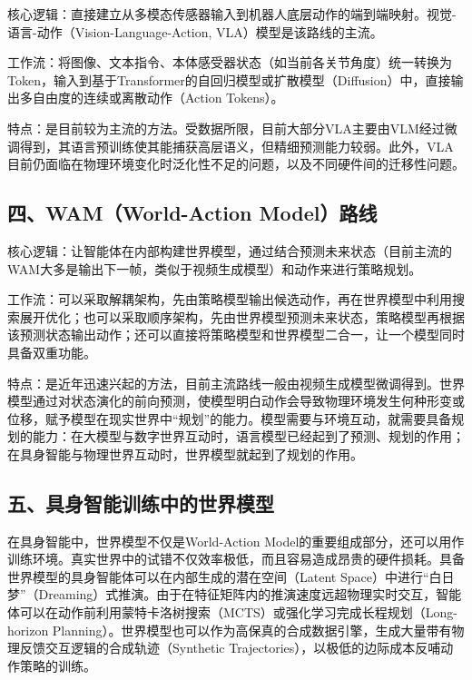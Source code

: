 核心逻辑：直接建立从多模态传感器输入到机器人底层动作的端到端映射。视觉-语言-动作（Vision-Language-Action, VLA）模型是该路线的主流。

工作流：将图像、文本指令、本体感受器状态（如当前各关节角度）统一转换为Token，输入到基于Transformer的自回归模型或扩散模型（Diffusion）中，直接输出多自由度的连续或离散动作（Action Tokens）。

特点：是目前较为主流的方法。受数据所限，目前大部分VLA主要由VLM经过微调得到，其语言预训练使其能捕获高层语义，但精细预测能力较弱。此外，VLA目前仍面临在物理环境变化时泛化性不足的问题，以及不同硬件间的迁移性问题。

\hypertarget{ux56dbwamworld-action-modelux8defux7ebf}{%
\subsection{四、WAM（World-Action Model）路线}\label{ux56dbwamworld-action-modelux8defux7ebf}}

核心逻辑：让智能体在内部构建世界模型，通过结合预测未来状态（目前主流的WAM大多是输出下一帧，类似于视频生成模型）和动作来进行策略规划。

工作流：可以采取解耦架构，先由策略模型输出候选动作，再在世界模型中利用搜索展开优化；也可以采取顺序架构，先由世界模型预测未来状态，策略模型再根据该预测状态输出动作；还可以直接将策略模型和世界模型二合一，让一个模型同时具备双重功能。

特点：是近年迅速兴起的方法，目前主流路线一般由视频生成模型微调得到。世界模型通过对状态演化的前向预测，使模型明白动作会导致物理环境发生何种形变或位移，赋予模型在现实世界中``规划''的能力。模型需要与环境互动，就需要具备规划的能力：在大模型与数字世界互动时，语言模型已经起到了预测、规划的作用；在具身智能与物理世界互动时，世界模型就起到了规划的作用。

\hypertarget{ux4e94ux5177ux8eabux667aux80fdux8badux7ec3ux4e2dux7684ux4e16ux754cux6a21ux578b}{%
\subsection{五、具身智能训练中的世界模型}\label{ux4e94ux5177ux8eabux667aux80fdux8badux7ec3ux4e2dux7684ux4e16ux754cux6a21ux578b}}

在具身智能中，世界模型不仅是World-Action Model的重要组成部分，还可以用作训练环境。真实世界中的试错不仅效率极低，而且容易造成昂贵的硬件损耗。具备世界模型的具身智能体可以在内部生成的潜在空间（Latent Space）中进行``白日梦''（Dreaming）式推演。由于在特征矩阵内的推演速度远超物理实时交互，智能体可以在动作前利用蒙特卡洛树搜索（MCTS）或强化学习完成长程规划（Long-horizon Planning）。世界模型也可以作为高保真的合成数据引擎，生成大量带有物理反馈交互逻辑的合成轨迹（Synthetic Trajectories），以极低的边际成本反哺动作策略的训练。

